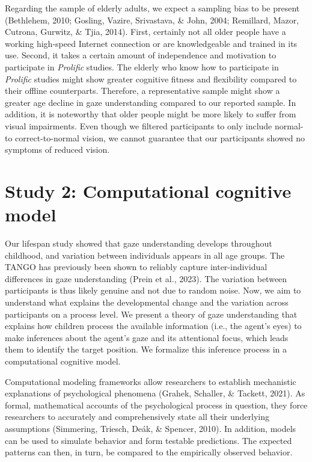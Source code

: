 \documentclass[
  man,mask,floatsintext]{apa6}
\begin{document}
Regarding the sample of elderly adults, we expect a sampling bias to be present (Bethlehem, 2010; Gosling, Vazire, Srivastava, \& John, 2004; Remillard, Mazor, Cutrona, Gurwitz, \& Tjia, 2014). First, certainly not all older people have a working high-speed Internet connection or are knowledgeable and trained in its use. Second, it takes a certain amount of independence and motivation to participate in \emph{Prolific} studies. The elderly who know how to participate in \emph{Prolific} studies might show greater cognitive fitness and flexibility compared to their offline counterparts. Therefore, a representative sample might show a greater age decline in gaze understanding compared to our reported sample. In addition, it is noteworthy that older people might be more likely to suffer from visual impairments. Even though we filtered participants to only include normal- to correct-to-normal vision, we cannot guarantee that our participants showed no symptoms of reduced vision.

\hypertarget{study-2-computational-cognitive-model}{%
\section{Study 2: Computational cognitive model}\label{study-2-computational-cognitive-model}}

Our lifespan study showed that gaze understanding develops throughout childhood, and variation between individuals appears in all age groups. The TANGO has previously been shown to reliably capture inter-individual differences in gaze understanding (Prein et al., 2023). The variation between participants is thus likely genuine and not due to random noise. Now, we aim to understand what explains the developmental change and the variation across participants on a process level. We present a theory of gaze understanding that explains how children process the available information (i.e., the agent's eyes) to make inferences about the agent's gaze and its attentional focus, which leads them to identify the target position. We formalize this inference process in a computational cognitive model.

Computational modeling frameworks allow researchers to establish mechanistic explanations of psychological phenomena (Grahek, Schaller, \& Tackett, 2021). As formal, mathematical accounts of the psychological process in question, they force researchers to accurately and comprehensively state all their underlying assumptions (Simmering, Triesch, Deák, \& Spencer, 2010). In addition, models can be used to simulate behavior and form testable predictions. The expected patterns can then, in turn, be compared to the empirically observed behavior.
\end{document}
